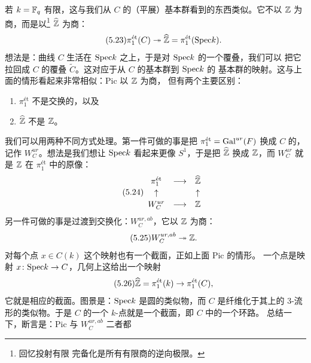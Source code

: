若 $k=\mathbb{F}_{q}$ 有限，这与我们从 $C$ 的（平展）基本群看到的东西类似。它不以 $\mathbb{Z}$
为商，而是以\footnote{回忆投射有限
完备化是所有有限商的逆向极限。} $\widehat{\mathbb{Z}}$ 为商：
\begin{equation}\tag{5.23}
\pi_{1}^{\text{ét}}(C)\twoheadrightarrow\widehat{\mathbb{Z}}=\pi_{1}^{\text{ét}}(\mathrm{Spec} k).
\end{equation}
想法是：曲线 $C$ 生活在 $\mathrm{Spec} k$ 之上，于是对 $\mathrm{Spec} k$ 的一个覆叠，我们可以
把它拉回成 $C$ 的覆叠 $\widetilde{C}$。这对应于从 $C$ 的基本群到 $\mathrm{Spec} k$ 的
基本群的映射。这与上面的情形看起来非常相似：$\mathrm{Pic}$ 以 $\mathbb{Z}$ 为商，
但有两个主要区别：
\begin{enumerate}
\item $\pi_{1}^{\text{ét}}$ 不是交换的，以及
\item $\widehat{\mathbb{Z}}$ 不是 $\mathbb{Z}$。
\end{enumerate}
我们可以用两种不同方式处理。第一件可做的事是把
$\pi_{1}^{\text{ét}}=\mathrm{Gal}^{ur}(F)$ 换成 $C$ 的，
记作 $W_{C}^{ur}$。想法是我们想让 $\mathrm{Spec} k$ 看起来更像 $S^{1}$，于是把
$\widehat{\mathbb{Z}}$ 换成 $\mathbb{Z}$，而 $W_{C}^{ur}$ 就是 $\mathbb{Z}$ 在
$\pi_{1}^{\text{ét}}$ 中的原像：
\begin{equation}\tag{5.24}
\begin{array}{ccc}
\pi_{1}^{\text{ét}} & \longrightarrow & \widehat{\mathbb{Z}}\\[2pt]
\uparrow & & \uparrow\\[2pt]
W_{C}^{ur} & \longrightarrow & \mathbb{Z}
\end{array}
\end{equation}
另一件可做的事是过渡到交换化：$W_{C}^{ur,ab}$，它以 $\mathbb{Z}$ 为商：
\begin{equation}\tag{5.25}
W_{C}^{ur,ab}\twoheadrightarrow\mathbb{Z}.
\end{equation}
对每个点 $x\in C(k)$ 这个映射也有一个截面，正如上面 $\mathrm{Pic}$ 的情形。
一个点是映射 $x\colon\mathrm{Spec} k\to C$，几何上这给出一个映射
\begin{equation}\tag{5.26}
\widehat{\mathbb{Z}}=\pi_{1}^{\text{ét}}(k)\to\pi_{1}^{\text{ét}}(C),
\end{equation}
它就是相应的截面。图景是：$\mathrm{Spec} k$ 是圆的类似物，而 $C$ 是纤维化于其上的
3-流形的类似物。于是 $C$ 的一个 $k$-点就是一个截面，即 $C$ 中的一个环路。
总结一下，断言是：$\mathrm{Pic}$ 与 $W_{C}^{ur,ab}$ 二者都


